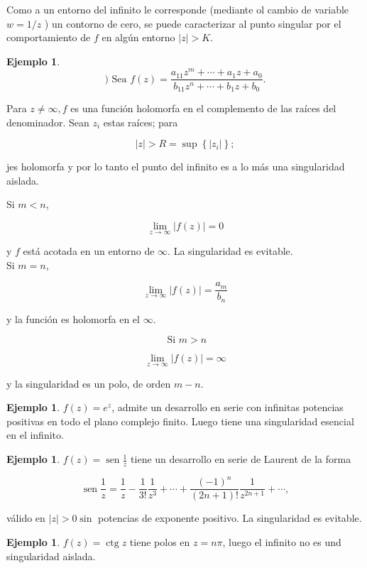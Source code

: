 \documentclass[10pt]{article}
\theoremstyle{plain}
\theoremstyle{definition}
\newtheorem{example}[theorem]{Ejemplo}
\theoremstyle{remark}
\begin{document}
Como a un entorno del infinito le corresponde (mediante ol cambio de variable $w=1 / z$ ) un contorno de cero, se puede caracterizar al punto singular por el comportamiento de $f$ en algún entorno $|z|>K$.

\begin{example}
$$
\text { ) Sea } f(z)=\frac{a_{11} z^{m}+\cdots+a_{1} z+a_{0}}{b_{11} z^{n}+\cdots+b_{1} z+b_{0}} \text {. }
$$

Para $z \neq \infty, f$ es una función holomorfa en el complemento de las raíces del denominador. Sean $z_{i}$ estas raíces; para

$$
|z|>R=\sup \left\{\left|z_{i}\right|\right\} ;
$$

jes holomorfa y por lo tanto el punto del infinito es a lo más una singularidad aislada.

Si $m<n$,

$$
\lim _{z \rightarrow \infty}|f(z)|=0
$$

y $f$ está acotada en un entorno de $\infty$. La singularidad es evitable.\\
Si $m=n$,

$$
\lim _{z \rightarrow \infty}|f(z)|=\frac{a_{m}}{b_{n}}
$$

y la función es holomorfa en el $\infty$.

$$
\text { Si } m>n
$$

$$
\lim _{z \rightarrow \infty}|f(z)|=\infty
$$

y la singularidad es un polo, de orden $m-n$.
\end{example}


\begin{example}
$f(z)=e^{z}$, admite un desarrollo en serie con infinitas potencias positivas en todo el plano complejo finito. Luego tiene una singularidad esencial en el infinito.
\end{example}

\begin{example}
$f(z)=\operatorname{sen} \frac{1}{z}$ tiene un desarrollo en serie de Laurent de la forma

$$
\operatorname{sen} \frac{1}{z}=\frac{1}{z}-\frac{1}{3!} \frac{1}{z^{3}}+\cdots+\frac{(-1)^{n}}{(2 n+1)!} \frac{1}{z^{2 n+1}}+\cdots,
$$

válido en $|z|>0 \sin$ potencias de exponente positivo. La singularidad es evitable.
\end{example}

\begin{example}
$f(z)=\operatorname{ctg} z$ tiene polos en $z=n \pi$, luego el infinito no es und singularidad aislada.
\end{example}
\end{document}

